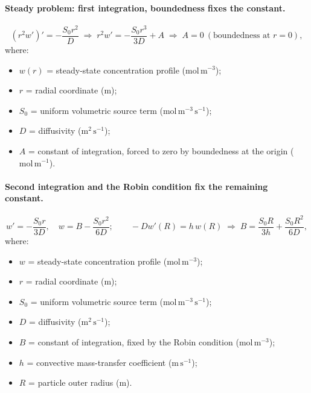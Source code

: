\documentclass[11pt,a4paper]{article}
\begin{document}
\paragraph{Steady problem: first integration, boundedness fixes the constant.}

\begin{equation}
\left(r^2w'\right)' = -\frac{S_0r^2}{D} \;\Longrightarrow\; r^2w' = -\frac{S_0r^3}{3D} + A \;\Longrightarrow\; A=0 \ (\text{boundedness at } r=0),
\label{eq:b:w-firstint}
\end{equation}
\vspace{-0.3em}
\noindent where:

\begin{itemize}[leftmargin=1.6em,itemsep=1pt,topsep=3pt,parsep=0pt]
  \item $w(r)$ = steady-state concentration profile ($\mathrm{mol\,m^{-3}}$);
  \item $r$ = radial coordinate ($\mathrm{m}$);
  \item $S_0$ = uniform volumetric source term ($\mathrm{mol\,m^{-3}\,s^{-1}}$);
  \item $D$ = diffusivity ($\mathrm{m^{2}\,s^{-1}}$);
  \item $A$ = constant of integration, forced to zero by boundedness at the origin ($\mathrm{mol\,m^{-1}}$).
\end{itemize}


\paragraph{Second integration and the Robin condition fix the remaining constant.}

\begin{equation}
w' = -\frac{S_0r}{3D}, \quad w = B - \frac{S_0r^2}{6D}; \qquad -Dw'(R) = h\,w(R) \;\Longrightarrow\; B = \frac{S_0R}{3h} + \frac{S_0R^2}{6D},
\label{eq:b:w-secondint}
\end{equation}
\vspace{-0.3em}
\noindent where:

\begin{itemize}[leftmargin=1.6em,itemsep=1pt,topsep=3pt,parsep=0pt]
  \item $w$ = steady-state concentration profile ($\mathrm{mol\,m^{-3}}$);
  \item $r$ = radial coordinate ($\mathrm{m}$);
  \item $S_0$ = uniform volumetric source term ($\mathrm{mol\,m^{-3}\,s^{-1}}$);
  \item $D$ = diffusivity ($\mathrm{m^{2}\,s^{-1}}$);
  \item $B$ = constant of integration, fixed by the Robin condition ($\mathrm{mol\,m^{-3}}$);
  \item $h$ = convective mass-transfer coefficient ($\mathrm{m\,s^{-1}}$);
  \item $R$ = particle outer radius ($\mathrm{m}$).
\end{itemize}
\end{document}
